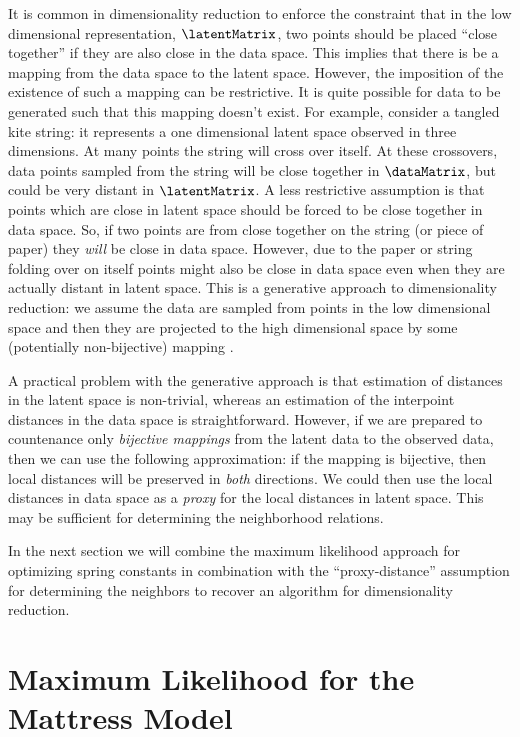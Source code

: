 It is common in dimensionality reduction to enforce the constraint
that in the low dimensional representation, $\latentMatrix$, two
points should be placed ``close together'' if they are also close in
the data space. This implies that there is be a mapping from the data
space to the latent space. However, the imposition of the existence of
such a mapping can be restrictive. It is quite possible for data to be
generated such that this mapping doesn't exist. For example, consider
a tangled kite string: it represents a one dimensional latent space
observed in three dimensions. At many points the string will cross
over itself. At these crossovers, data points sampled from the string
will be close together in $\dataMatrix$, but could be very distant in
$\latentMatrix$. A less restrictive assumption is that points which
are close in latent space should be forced to be close together in
data space. So, if two points are from close together on the string
(or piece of paper) they \emph{will} be close in data space. However,
due to the paper or string folding over on itself points might also be
close in data space even when they are actually distant in latent
space. This is a generative approach to dimensionality reduction: we
assume the data are sampled from points in the low dimensional space
and then they are projected to the high dimensional space by some
(potentially non-bijective) mapping \citep{MacKay:wondsa95,Bishop:gtm_ncomp98,Lawrence:pnpca05}.

A practical problem with the generative approach is that estimation of
distances in the latent space is non-trivial, whereas an estimation of
the interpoint distances in the data space is
straightforward. However, if we are prepared to countenance only
\emph{bijective mappings} from the latent data to the observed data, then we
can use the following approximation: if the mapping is bijective, then
local distances will be preserved in \emph{both} directions. We could
then use the local distances in data space as a \emph{proxy} for the
local distances in latent space. This may be sufficient for determining the
neighborhood relations.

In the next section we will combine the maximum likelihood approach
for optimizing spring constants in combination with the
``proxy-distance'' assumption for determining the neighbors to recover
an algorithm for dimensionality reduction.

\section{Maximum Likelihood for the Mattress Model}

